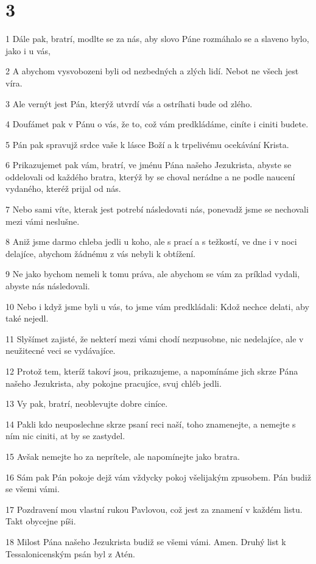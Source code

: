 \chapter{3}

\par 1 Dále pak, bratrí, modlte se za nás, aby slovo Páne rozmáhalo se a slaveno bylo, jako i u vás,
\par 2 A abychom vysvobozeni byli od nezbedných a zlých lidí. Nebot ne všech jest víra.
\par 3 Ale vernýt jest Pán, kterýž utvrdí vás a ostríhati bude od zlého.
\par 4 Doufámet pak v Pánu o vás, že to, což vám predkládáme, ciníte i ciniti budete.
\par 5 Pán pak spravujž srdce vaše k lásce Boží a k trpelivému ocekávání Krista.
\par 6 Prikazujemet pak vám, bratrí, ve jménu Pána našeho Jezukrista, abyste se oddelovali od každého bratra, kterýž by se choval nerádne a ne podle naucení vydaného, kteréž prijal od nás.
\par 7 Nebo sami víte, kterak jest potrebí následovati nás, ponevadž jsme se nechovali mezi vámi neslušne.
\par 8 Aniž jsme darmo chleba jedli u koho, ale s prací a s težkostí, ve dne i v noci delajíce, abychom žádnému z vás nebyli k obtížení.
\par 9 Ne jako bychom nemeli k tomu práva, ale abychom se vám za príklad vydali, abyste nás následovali.
\par 10 Nebo i když jsme byli u vás, to jsme vám predkládali: Kdož nechce delati, aby také nejedl.
\par 11 Slyšímet zajisté, že nekterí mezi vámi chodí nezpusobne, nic nedelajíce, ale v neužitecné veci se vydávajíce.
\par 12 Protož tem, kteríž takoví jsou, prikazujeme, a napomínáme jich skrze Pána našeho Jezukrista, aby pokojne pracujíce, svuj chléb jedli.
\par 13 Vy pak, bratrí, neoblevujte dobre ciníce.
\par 14 Pakli kdo neuposlechne skrze psaní reci naší, toho znamenejte, a nemejte s ním nic ciniti, at by se zastydel.
\par 15 Avšak nemejte ho za neprítele, ale napomínejte jako bratra.
\par 16 Sám pak Pán pokoje dejž vám vždycky pokoj všelijakým zpusobem. Pán budiž se všemi vámi.
\par 17 Pozdravení mou vlastní rukou Pavlovou, což jest za znamení v každém listu. Takt obycejne píši.
\par 18 Milost Pána našeho Jezukrista budiž se všemi vámi. Amen. Druhý list k Tessalonicenským psán byl z Atén.



